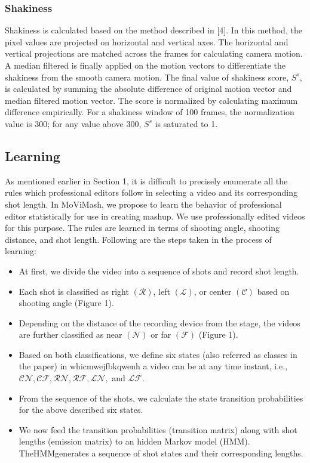 \documentclass{sig-alternate-05-2015}
\begin{document}
\subsubsection{Shakiness}

Shakiness is calculated based on the method described in [4].
In this method, the pixel values are projected on horizontal and
vertical axes. The horizontal and vertical projections are matched
across the frames for calculating camera motion. A median filtered
is finally applied on the motion vectors to differentiate the shakiness
from the smooth camera motion. The final value of shakiness
score, $S^s$, is calculated by summing the absolute difference of original
motion vector and median filtered motion vector. The score is
normalized by calculating maximum difference empirically. For a
shakiness window of 100 frames, the normalization value is 300;
for any value above 300, $S^s$ is saturated to 1.

\subsection{Learning}

As mentioned earlier in Section 1, it is difficult to precisely enumerate
all the rules which professional editors follow in selecting
a video and its corresponding shot length. In MoViMash, we propose
to learn the behavior of professional editor statistically for use
in creating mashup. We use professionally edited videos for this
purpose. The rules are learned in terms of shooting angle, shooting
distance, and shot length. Following are the steps taken in the
process of learning:

\begin{itemize}
\item At first, we divide the video into a sequence of shots and
record shot length.
\item Each shot is classified as right $\mathcal{(R)}$, left $\mathcal{(L)}$, or center $\mathcal{(C)}$ based on shooting angle (Figure 1).
\item Depending on the distance of the recording device from the
stage, the videos are further classified as near $\mathcal{(N)}$ or far $\mathcal{(F)}$ (Figure 1).
\item Based on both classifications, we define six states (also referred
as classes in the paper) in whicmwejfbkqwenh a video can be at any
time instant, i.e., $\mathcal{CN, CF, RN, RF, LN,}$ and $\mathcal{LF}$.
\item From the sequence of the shots, we calculate the state transition
probabilities for the above described six states.
\item We now feed the transition probabilities (transition matrix)
along with shot lengths (emission matrix) to an hidden Markov
model (HMM). TheHMMgenerates a sequence of shot states
and their corresponding lengths.
\end{itemize}
\end{document}
